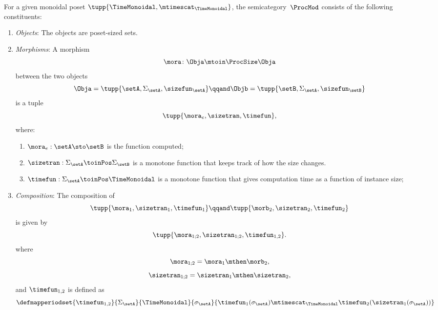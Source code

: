 \begin{definition}
	\label{def:ProcMod}
	For a given monoidal poset $\tupp{\TimeMonoidal, \mtimescat_{\TimeMonoidal}}$, the semicategory~$\ProcMod$ consists of the following constituents:
	\begin{enumerate}
		\item \emph{Objects}: The objects are poset-sized sets.
		\item \emph{Morphisms}: A morphism
		      \begin{equation}
			      \mora \colon \Obja \mtoin\ProcSize \Obja
		      \end{equation}
		      between the two objects
		      \begin{equation}
			      \Obja = \tupp{\setA, \Sigma_{\setA}, \sizefun_{\setA}}
			      \qqand
			      \Objb = \tupp{\setB, \Sigma_{\setA}, \sizefun_{\setB}}
		      \end{equation}
		      is a tuple
		      \begin{equation}
			      \tupp{\mora_e, \sizetran, \timefun },
		      \end{equation}
		      where:
		      \begin{enumerate}
			      \item $\mora_e : \setA \sto \setB$ is the function computed;
			      \item $\sizetran: \Sigma_{\setA} \toinPos \Sigma_{\setB}$ is a monotone function that keeps track of how the size changes.
			      \item $\timefun: \Sigma_{\setA} \toinPos \TimeMonoidal$ is a monotone function that gives computation time as a function of instance size;
		      \end{enumerate}

		\item \emph{Composition}: The composition of
		      \begin{equation}
			      \tupp{\mora_1, \sizetran_1,  \timefun_1  }
			      \qqand
			      \tupp{\morb_2, \sizetran_2,  \timefun_2  }
		      \end{equation}
		      is given by
		      \begin{equation}
			      \tupp{
				      \mora_{1;2},
				      \sizetran_{1;2},
				      \timefun_{1,2}
			      }.
		      \end{equation}
		      where
		      \begin{equation}
			      \mora_{1;2} = \mora_1 \mthen \morb_2,
		      \end{equation}
		      \begin{equation}
			      \sizetran_{1;2} = \sizetran_1 \mthen \sizetran_2,
		      \end{equation}
		      and $\timefun_{1,2}$ is defined as
		      \begin{equation}
			      \defmapperiodset{
				      \timefun_{1,2}
			      }{
				      \Sigma_{\setA}
			      }{
				      \TimeMonoidal
			      }{
				      \sigma_{\setA}
			      }{
				      \timefun_1(\sigma_{\setA}) \mtimescat_{\TimeMonoidal} \timefun_2(\sizetran_1(\sigma_{\setA}))
			      }
		      \end{equation}
	\end{enumerate}
\end{definition}

